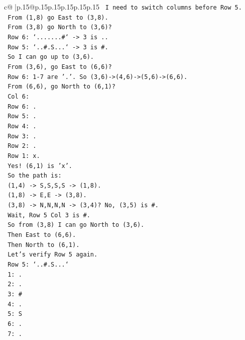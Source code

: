 \documentclass{article}
\begin{document}
{\begin{supertabular}{c@{$\;$}|p{.15\linewidth}@{}p{.15\linewidth}p{.15\linewidth}p{.15\linewidth}p{.15\linewidth}p{.15\linewidth}}
{{{\texttt{     I need to switch columns before Row 5.} \\
\texttt{     From (1,8) go East to (3,8).} \\
\texttt{     From (3,8) go North to (3,6)?} \\
\texttt{     Row 6: `.......\#` {-}> 3 is ..} \\
\texttt{     Row 5: `..\#.S...` {-}> 3 is \#.} \\
\texttt{     So I can go up to (3,6).} \\
\texttt{     From (3,6), go East to (6,6)?} \\
\texttt{     Row 6: 1{-}7 are '.'. So (3,6){-}>(4,6){-}>(5,6){-}>(6,6).} \\
\texttt{     From (6,6), go North to (6,1)?} \\
\texttt{     Col 6:} \\
\texttt{     Row 6: .} \\
\texttt{     Row 5: .} \\
\texttt{     Row 4: .} \\
\texttt{     Row 3: .} \\
\texttt{     Row 2: .} \\
\texttt{     Row 1: x.} \\
\texttt{     Yes! (6,1) is 'x'.} \\
\texttt{     So the path is:} \\
\texttt{     (1,4) {-}> S,S,S,S {-}> (1,8).} \\
\texttt{     (1,8) {-}> E,E {-}> (3,8).} \\
\texttt{     (3,8) {-}> N,N,N,N {-}> (3,4)? No, (3,5) is \#.} \\
\texttt{     Wait, Row 5 Col 3 is \#.} \\
\texttt{     So from (3,8) I can go North to (3,6).} \\
\texttt{     Then East to (6,6).} \\
\texttt{     Then North to (6,1).} \\
\texttt{     Let's verify Row 5 again.} \\
\texttt{     Row 5: `..\#.S...`} \\
\texttt{     1: .} \\
\texttt{     2: .} \\
\texttt{     3: \#} \\
\texttt{     4: .} \\
\texttt{     5: S} \\
\texttt{     6: .} \\
\texttt{     7: .} \\
}}}
\end{supertabular}}
\end{document}
